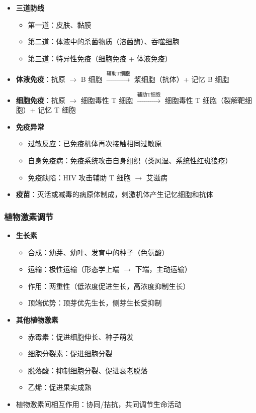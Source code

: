 \begin{itemize}
  \item \textbf{三道防线}
  \begin{itemize}
    \item 第一道：皮肤、黏膜
    \item 第二道：体液中的杀菌物质（溶菌酶）、吞噬细胞
    \item 第三道：特异性免疫（细胞免疫 + 体液免疫）
  \end{itemize}
  \item \textbf{体液免疫}：抗原 $\to$ B 细胞 $\xrightarrow{\text{辅助T细胞}}$ 浆细胞（抗体）+ 记忆 B 细胞
  \item \textbf{细胞免疫}：抗原 $\to$ 细胞毒性 T 细胞 $\xrightarrow{\text{辅助T细胞}}$ 细胞毒性 T 细胞（裂解靶细胞）+ 记忆 T 细胞
  \item \textbf{免疫异常}
  \begin{itemize}
    \item 过敏反应：已免疫机体再次接触相同过敏原
    \item 自身免疫病：免疫系统攻击自身组织（类风湿、系统性红斑狼疮）
    \item 免疫缺陷：HIV 攻击辅助 T 细胞 $\to$ 艾滋病
  \end{itemize}
  \item \textbf{疫苗}：灭活或减毒的病原体制成，刺激机体产生记忆细胞和抗体
\end{itemize}

\subsubsection{植物激素调节}

\begin{itemize}
  \item \textbf{生长素}
  \begin{itemize}
    \item 合成：幼芽、幼叶、发育中的种子（色氨酸）
    \item 运输：极性运输（形态学上端 $\to$ 下端，主动运输）
    \item 作用：两重性（低浓度促进生长，高浓度抑制生长）
    \item 顶端优势：顶芽优先生长，侧芽生长受抑制
  \end{itemize}
  \item \textbf{其他植物激素}
  \begin{itemize}
    \item 赤霉素：促进细胞伸长、种子萌发
    \item 细胞分裂素：促进细胞分裂
    \item 脱落酸：抑制细胞分裂、促进衰老脱落
    \item 乙烯：促进果实成熟
  \end{itemize}
  \item 植物激素间相互作用：协同/拮抗，共同调节生命活动
\end{itemize}

